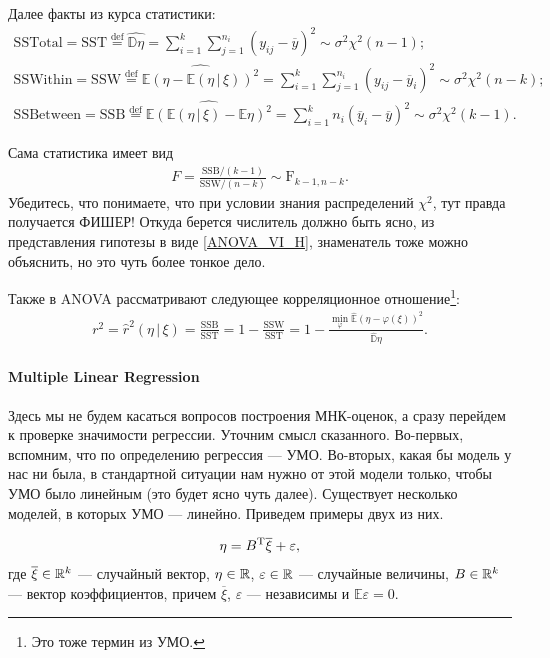 Далее факты из курса статистики:
\begin{gather*}
    \mathrm {SS Total} = \mathrm {SST} \overset{\mathrm{def}}{=} \widehat{\mathbb D \eta} = \sum_{i=1}^k \sum_{j=1}^{n_i} (y_{ij} - \overline y)^2 \sim \mathcal \sigma^2 \chi^2 (n - 1);\\
    \mathrm {SS Within} = \mathrm {SSW} \overset{\mathrm{def}}{=} \widehat{\mathbb E(\eta - \mathbb E(\eta\, | \, \xi))^2} = \sum_{i=1}^k \sum_{j=1}^{n_i} (y_{ij} - \overline y_i)^2\sim \sigma^2 \mathcal \chi^2 (n - k);\\
    \mathrm {SS Between} = \mathrm {SSB} \overset{\mathrm{def}}{=} \widehat{\mathbb E(\mathbb E(\eta\, | \, \xi) - \mathbb E \eta)^2} = \sum_{i=1}^k n_i (\overline y_i - \overline y)^2 \sim \sigma^2 \mathcal \chi^2 (k - 1).
\end{gather*}

Сама статистика имеет вид
\begin{gather*}
    F = \frac{\mathrm{SSB} / (k - 1)}{\mathrm{SSW} / (n - k)} \sim \mathrm F_{k-1,n-k}.
\end{gather*}
Убедитесь, что понимаете, что при условии знания распределений $\chi^2$, тут правда получается ФИШЕР!
Откуда берется числитель должно быть ясно, из представления гипотезы в виде \eqref{ANOVA_VI_H}, знаменатель тоже можно объяснить, но это чуть более тонкое дело.

Также в ANOVA рассматривают следующее корреляционное отношение\footnote{Это тоже термин из УМО.}:
\begin{gather}
    \label{ANOVA_cor}
    r^2 = \hat r^2(\eta \, | \, \xi) = \mathrm{\frac{SSB}{SST}} = 1 - \mathrm{\frac{SSW}{SST}} = 1 - \frac{\min_{\varphi} \widehat {\mathbb E}(\eta - \varphi(\xi))^2}{\widehat {\mathbb D} \eta}.
\end{gather}

\paragraph{Multiple Linear Regression}
Здесь мы не будем касаться вопросов построения МНК-оценок, а сразу перейдем к проверке значимости регрессии.
Уточним смысл сказанного. Во-первых, вспомним, что по определению регрессия --- УМО.
Во-вторых, какая бы модель у нас ни была, в стандартной ситуации нам нужно от этой модели только, чтобы УМО было линейным
(это будет ясно чуть далее).
Существует несколько моделей, в которых УМО --- линейно. Приведем примеры двух из них.

\begin{gather*}
    \eta = B^{\mathrm{T}} \overline \xi + \varepsilon,
\end{gather*}
где $\overline \xi \in \mathbb{R}^k$ --- случайный вектор, $\eta \in \mathbb{R}$, $\varepsilon \in \mathbb{R}$ --- 
случайные величины, $B \in \mathrm {\mathbb{R}}^k$ --- вектор коэффициентов,
причем $\overline \xi$, $\varepsilon$ --- независимы и $\mathbb E\varepsilon = 0$.


